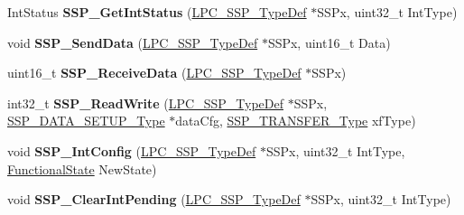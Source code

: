 \begin{DoxyCompactItemize}
\item 
\hypertarget{group___s_s_p___public___functions_gae3f869e56a14351d6c4e2485131273e8}{\-Int\-Status {\bfseries \-S\-S\-P\-\_\-\-Get\-Int\-Status} (\hyperlink{struct_l_p_c___s_s_p___type_def}{\-L\-P\-C\-\_\-\-S\-S\-P\-\_\-\-Type\-Def} $\ast$\-S\-S\-Px, uint32\-\_\-t \-Int\-Type)}\label{group___s_s_p___public___functions_gae3f869e56a14351d6c4e2485131273e8}

\item 
\hypertarget{group___s_s_p___public___functions_ga6a77261500e4fa65b0ecdfb70ccd8c00}{void {\bfseries \-S\-S\-P\-\_\-\-Send\-Data} (\hyperlink{struct_l_p_c___s_s_p___type_def}{\-L\-P\-C\-\_\-\-S\-S\-P\-\_\-\-Type\-Def} $\ast$\-S\-S\-Px, uint16\-\_\-t \-Data)}\label{group___s_s_p___public___functions_ga6a77261500e4fa65b0ecdfb70ccd8c00}

\item 
\hypertarget{group___s_s_p___public___functions_ga14e9bdfc76b1398e4fdb09775fd6c240}{uint16\-\_\-t {\bfseries \-S\-S\-P\-\_\-\-Receive\-Data} (\hyperlink{struct_l_p_c___s_s_p___type_def}{\-L\-P\-C\-\_\-\-S\-S\-P\-\_\-\-Type\-Def} $\ast$\-S\-S\-Px)}\label{group___s_s_p___public___functions_ga14e9bdfc76b1398e4fdb09775fd6c240}

\item 
\hypertarget{group___s_s_p___public___functions_gad7af61596a83ee98af9935421480612e}{int32\-\_\-t {\bfseries \-S\-S\-P\-\_\-\-Read\-Write} (\hyperlink{struct_l_p_c___s_s_p___type_def}{\-L\-P\-C\-\_\-\-S\-S\-P\-\_\-\-Type\-Def} $\ast$\-S\-S\-Px, \hyperlink{struct_s_s_p___d_a_t_a___s_e_t_u_p___type}{\-S\-S\-P\-\_\-\-D\-A\-T\-A\-\_\-\-S\-E\-T\-U\-P\-\_\-\-Type} $\ast$data\-Cfg, \hyperlink{group___s_s_p___public___types_ga34f9cea91f43d14807778072c5f3c20f}{\-S\-S\-P\-\_\-\-T\-R\-A\-N\-S\-F\-E\-R\-\_\-\-Type} xf\-Type)}\label{group___s_s_p___public___functions_gad7af61596a83ee98af9935421480612e}

\item 
\hypertarget{group___s_s_p___public___functions_ga565b514ade8cdf734f008041df72a946}{void {\bfseries \-S\-S\-P\-\_\-\-Int\-Config} (\hyperlink{struct_l_p_c___s_s_p___type_def}{\-L\-P\-C\-\_\-\-S\-S\-P\-\_\-\-Type\-Def} $\ast$\-S\-S\-Px, uint32\-\_\-t \-Int\-Type, \hyperlink{group___l_p_c___types___public___types_gac9a7e9a35d2513ec15c3b537aaa4fba1}{\-Functional\-State} \-New\-State)}\label{group___s_s_p___public___functions_ga565b514ade8cdf734f008041df72a946}

\item 
\hypertarget{group___s_s_p___public___functions_ga746ab6c5b143261a45082008b83e6dc8}{void {\bfseries \-S\-S\-P\-\_\-\-Clear\-Int\-Pending} (\hyperlink{struct_l_p_c___s_s_p___type_def}{\-L\-P\-C\-\_\-\-S\-S\-P\-\_\-\-Type\-Def} $\ast$\-S\-S\-Px, uint32\-\_\-t \-Int\-Type)}\label{group___s_s_p___public___functions_ga746ab6c5b143261a45082008b83e6dc8}

\end{DoxyCompactItemize}
